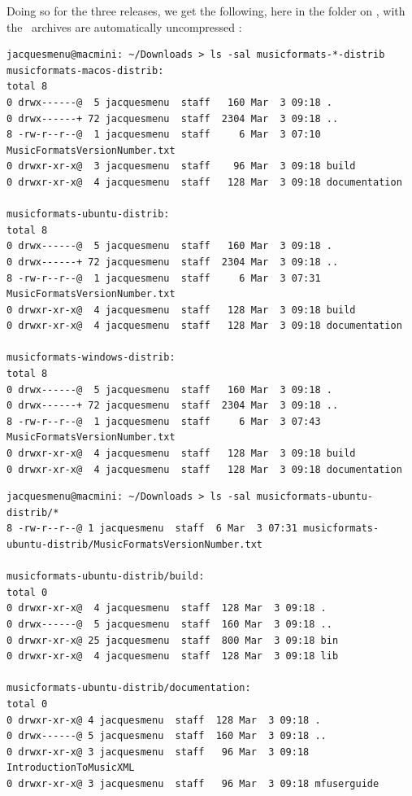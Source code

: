 Doing so for the three releases, we get the following, here in the  folder on \MacOS, with the \zip\ archives are automatically uncompressed :
\begin{lstlisting}[language=Terminal]
jacquesmenu@macmini: ~/Downloads > ls -sal musicformats-*-distrib
musicformats-macos-distrib:
total 8
0 drwx------@  5 jacquesmenu  staff   160 Mar  3 09:18 .
0 drwx------+ 72 jacquesmenu  staff  2304 Mar  3 09:18 ..
8 -rw-r--r--@  1 jacquesmenu  staff     6 Mar  3 07:10 MusicFormatsVersionNumber.txt
0 drwxr-xr-x@  3 jacquesmenu  staff    96 Mar  3 09:18 build
0 drwxr-xr-x@  4 jacquesmenu  staff   128 Mar  3 09:18 documentation

musicformats-ubuntu-distrib:
total 8
0 drwx------@  5 jacquesmenu  staff   160 Mar  3 09:18 .
0 drwx------+ 72 jacquesmenu  staff  2304 Mar  3 09:18 ..
8 -rw-r--r--@  1 jacquesmenu  staff     6 Mar  3 07:31 MusicFormatsVersionNumber.txt
0 drwxr-xr-x@  4 jacquesmenu  staff   128 Mar  3 09:18 build
0 drwxr-xr-x@  4 jacquesmenu  staff   128 Mar  3 09:18 documentation

musicformats-windows-distrib:
total 8
0 drwx------@  5 jacquesmenu  staff   160 Mar  3 09:18 .
0 drwx------+ 72 jacquesmenu  staff  2304 Mar  3 09:18 ..
8 -rw-r--r--@  1 jacquesmenu  staff     6 Mar  3 07:43 MusicFormatsVersionNumber.txt
0 drwxr-xr-x@  4 jacquesmenu  staff   128 Mar  3 09:18 build
0 drwxr-xr-x@  4 jacquesmenu  staff   128 Mar  3 09:18 documentation
\end{lstlisting}

\begin{lstlisting}[language=Terminal]
jacquesmenu@macmini: ~/Downloads > ls -sal musicformats-ubuntu-distrib/*
8 -rw-r--r--@ 1 jacquesmenu  staff  6 Mar  3 07:31 musicformats-ubuntu-distrib/MusicFormatsVersionNumber.txt

musicformats-ubuntu-distrib/build:
total 0
0 drwxr-xr-x@  4 jacquesmenu  staff  128 Mar  3 09:18 .
0 drwx------@  5 jacquesmenu  staff  160 Mar  3 09:18 ..
0 drwxr-xr-x@ 25 jacquesmenu  staff  800 Mar  3 09:18 bin
0 drwxr-xr-x@  4 jacquesmenu  staff  128 Mar  3 09:18 lib

musicformats-ubuntu-distrib/documentation:
total 0
0 drwxr-xr-x@ 4 jacquesmenu  staff  128 Mar  3 09:18 .
0 drwx------@ 5 jacquesmenu  staff  160 Mar  3 09:18 ..
0 drwxr-xr-x@ 3 jacquesmenu  staff   96 Mar  3 09:18 IntroductionToMusicXML
0 drwxr-xr-x@ 3 jacquesmenu  staff   96 Mar  3 09:18 mfuserguide
\end{lstlisting}

